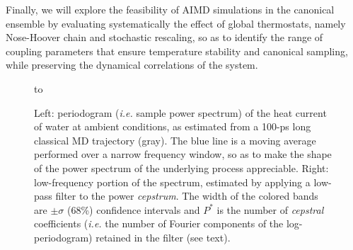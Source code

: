 Finally, we will explore the feasibility of AIMD simulations in the canonical ensemble by evaluating systematically the effect of global thermostats, namely Nose-Hoover chain\cite{Martyna:1992gy} and stochastic rescaling,\cite{Bussi:2007cs} so as to identify the range of coupling parameters that ensure temperature stability and canonical sampling, while preserving the dynamical correlations of the system.

\begin{figure}
\hbox to 
\vspace*{-5mm}
\caption{Left: periodogram (\emph{i.e.} sample power spectrum) of the heat current of water at ambient conditions, as estimated from a 100-ps long classical MD trajectory (gray).\cite{Ercole2017} The blue line is a moving average performed over a narrow frequency window, so as to make the shape of the power spectrum of the underlying process appreciable. Right: low-frequency portion of the spectrum, estimated by applying a low-pass filter to the power \emph{cepstrum}. The width of the colored bands are $\pm\sigma$ (68\%) confidence intervals and $P^*$ is the number of \emph{cepstral} coefficients (\emph{i.e.} the number of Fourier components of the log-periodogram) retained in the filter (see text). }
\label{fig:periodogram-cepstrum}
\vspace{-5mm}
\end{figure}

